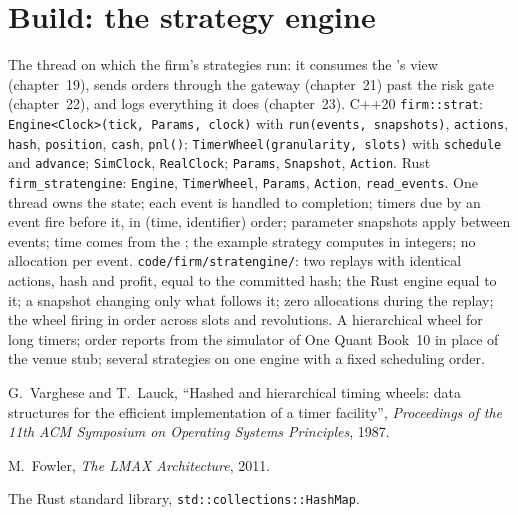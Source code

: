 \section{Build: the strategy engine}\label{bld:ll:the-strategy-engine:stratengine}

\begin{build}
 The thread on which the firm's strategies run: it consumes the 's view (chapter~19), sends orders
through the gateway (chapter~21) past the risk gate (chapter~22), and logs everything it does (chapter~23).
 C++20 \texttt{firm::strat}: \texttt{Engine<Clock>(tick, Params, clock)} with \texttt{run(events, snapshots)},
\texttt{actions}, \texttt{hash}, \texttt{position}, \texttt{cash}, \texttt{pnl()}; \texttt{TimerWheel(granularity, slots)} with
\texttt{schedule} and \texttt{advance}; \texttt{SimClock}, \texttt{RealClock}; \texttt{Params}, \texttt{Snapshot},
\texttt{Action}. Rust \texttt{firm\_stratengine}: \texttt{Engine}, \texttt{TimerWheel}, \texttt{Params}, \texttt{Action},
\texttt{read\_events}.
 One thread owns the state; each event is handled to completion; timers due by an event fire before it, in (time,
identifier) order; parameter snapshots apply between events; time comes from the ; the example strategy computes
in integers; no allocation per event.
 \texttt{code/firm/stratengine/}: two replays with identical actions, hash and profit, equal to the
committed hash; the Rust engine equal to it; a snapshot changing only what follows it; zero allocations during the replay; the
wheel firing in order across slots and revolutions.
 A hierarchical wheel for long timers; order reports from the simulator of One Quant Book~10 in place of the venue
stub; several strategies on one engine with a fixed scheduling order.
\end{build}

\begin{omsources}
\item G.~Varghese and T.~Lauck, ``Hashed and hierarchical timing wheels: data structures for the efficient implementation of a
timer facility'', \emph{Proceedings of the 11th ACM Symposium on Operating Systems Principles}, 1987.
\item M.~Fowler, \emph{The LMAX Architecture}, 2011.
\item The Rust standard library, \texttt{std::collections::HashMap}.
\end{omsources}

